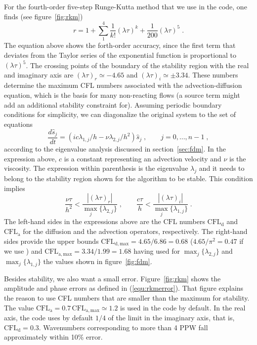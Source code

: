 {For the fourth-order five-step Runge-Kutta method that we use in the code, one finds (see figure~\ref{fig:rkm})
\begin{equation}
  r=1+\sum_1^4\frac{1}{k!}(\lambda \tau)^k+\frac{1}{200}(\lambda \tau)^5 \;.
\end{equation}
The equation above shows the forth-order accuracy, since the first term that deviates from the Taylor series of the exponential function is proportional to $(\lambda\tau)^5$. The crossing points of the boundary of the stability region with the real and imaginary axis are $(\lambda \tau)_{r}\simeq-4.65$ and $(\lambda \tau)_{i}\simeq\pm 3.34$. These numbers determine the maximum CFL numbers associated with the advection-diffusion equation, which is the basis for many non-reacting flows (a source term might add an additional stability constraint for). Assuming periodic boundary conditions for simplicity, we can diagonalize the original system to the set of equations
\begin{equation}
  \frac{d\hat{s}_j}{dt}=(ic\lambda_{1,j}/h -\nu\lambda_{2,j}/h^2)\hat{s}_j \;,\qquad j=0,\ldots,n-1\;,
  \label{equ:eigenvalues}
\end{equation}
according to the eigenvalue analysis discussed in section~\ref{sec:fdm}. In the expression above, $c$ is a constant representing an advection velocity and $\nu$ is the viscosity.  The expression within parenthesis is the eigenvalue $\lambda_j$ and it needs to belong to the stability region shown for the algorithm to be stable. This condition implies
\begin{equation}
  \frac{\nu\tau}{h^2}<\frac{|(\lambda \tau)_{r}|}{\max_j\{\lambda_{2,j}\}}\;,\qquad
  \frac{c\tau}{h}<\frac{|(\lambda \tau)_{i}|}{\max_j\{\lambda_{1,j}\}} \;.
\end{equation}
The left-hand sides in the expressions above are the $\textrm{CFL}$ numbers $\textrm{CFL}_\mathrm{d}$ and $\textrm{CFL}_\mathrm{a}$ for the diffusion and the advection operators, respectively. The right-hand sides provide the upper bounds $\textrm{CFL}_\mathrm{d,max}=4.65/6.86=0.68$ ($4.65/\pi^2=0.47$ if we use \cite{Lamballais:2011}) and $\textrm{CFL}_\mathrm{a,max}=3.34/1.99=1.68$ having used for $\max_j\{\lambda_{2,j}\}$ and $\max_j\{\lambda_{1,j}\}$ the values shown in figure~\ref{fig:fdm}.

Besides stability, we also want a small error. Figure~\ref{fig:rkm} shows the amplitude and phase errors as defined in (\ref{equ:rkmerror}). That figure explains the reason to use CFL numbers that are smaller than the maximum for stability. The value $\mathrm{CFL}_\mathrm{a}=0.7\,\mathrm{CFL}_\mathrm{a,max}\simeq 1.2$ is used in the code by default. In the real axis, the code uses by default $1/4$ of the limit in the imaginary axis, that is, $\textrm{CFL}_\mathrm{d}=0.3$. Wavenumbers corresponding to more than 4 PPW fall approximately within 10\% error.

}
